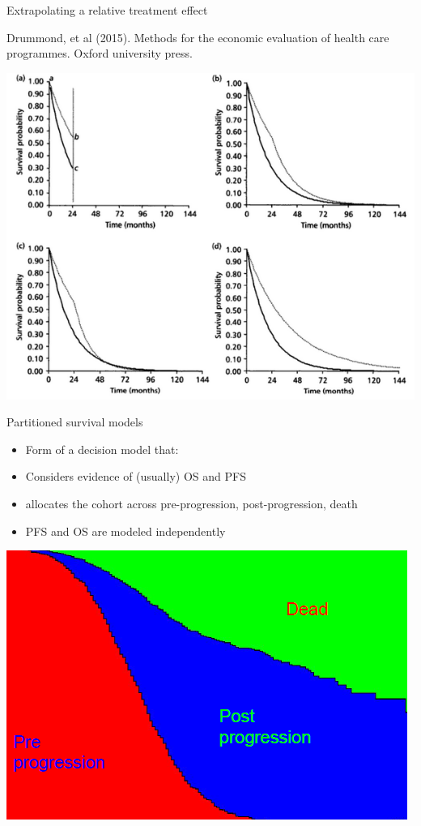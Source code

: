 \documentclass[ignorenonframetext,]{beamer}
\providecommand{\tightlist}{%
  \setlength{\itemsep}{0pt}\setlength{\parskip}{0pt}}
\begin{document}
\begin{frame}{Extrapolating a relative treatment effect}

Drummond, et al (2015). Methods for the economic evaluation of health
care programmes. Oxford university press.

\includegraphics[width=0.8\linewidth]{figures/drummond}

\end{frame}

\begin{frame}{Partitioned survival models}

\begin{itemize}
\tightlist
\item
  Form of a decision model that:
\item
  Considers evidence of (usually) OS and PFS
\item
  allocates the cohort across pre-progression, post-progression, death
\item
  PFS and OS are modeled independently
\end{itemize}

\end{frame}

\begin{frame}

\includegraphics[width=1\linewidth]{figures/psm}

\end{frame}
\end{document}
